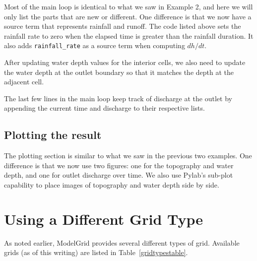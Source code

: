 \documentclass[12pt]{article}
\newcommand{\code}[1]{{\tt #1}}
\begin{document}
Most of the main loop is identical to what we saw in Example 2, and here we will only list the parts that are new or different. One difference is that we now have a source term that represents rainfall and runoff. The code listed above sets the rainfall rate to zero when the elapsed time is greater than the rainfall duration. It also adds \code{rainfall\_rate} as a source term when computing $dh/dt$.



After updating water depth values for the interior cells, we also need to update the water depth at the outlet boundary so that it matches the depth at the adjacent cell.



The last few lines in the main loop keep track of discharge at the outlet by appending the current time and discharge to their respective lists.

\subsection{Plotting the result}

The plotting section is similar to what we saw in the previous two examples. One difference is that we now use two figures: one for the topography and water depth, and one for outlet discharge over time. We also use Pylab's sub-plot capability to place images of topography and water depth side by side.



\section{Using a Different Grid Type}

As noted earlier, ModelGrid provides several different types of grid. Available grids (as of this writing) are listed in Table~\ref{gridtypestable}.
\end{document}

